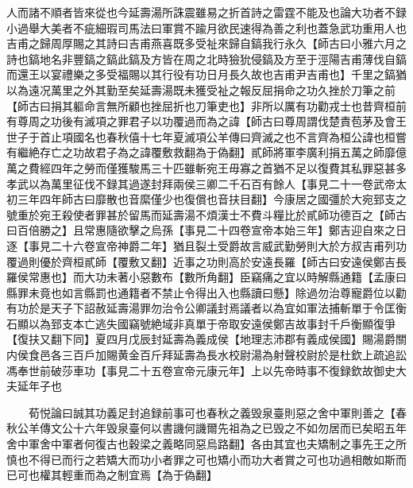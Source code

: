 人而諸不順者皆來從也今延壽湯所誅震雖易之折首詩之雷霆不能及也論大功者不録小過舉大美者不疵細瑕司馬法曰軍賞不踰月欲民速得為善之利也蓋急武功重用人也吉甫之歸周厚賜之其詩曰吉甫燕喜既多受祉來歸自鎬我行永久【師古曰小雅六月之詩也鎬地名非豐鎬之鎬此鎬及方皆在周之北時獫狁侵鎬及方至于涇陽吉甫薄伐自鎬而還王以宴禮樂之多受福賜以其行役有功日月長久故也吉甫尹吉甫也】千里之鎬猶以為遠况萬里之外其勤至矣延壽湯既未獲受祉之報反屈捐命之功久挫於刀筆之前【師古曰捐其軀命言無所顧也挫屈折也刀筆吏也】非所以厲有功勸戎士也昔齊桓前有尊周之功後有滅項之罪君子以功覆過而為之諱【師古曰尊周謂伐楚責苞茅及會王世子于首止項國名也春秋僖十七年夏滅項公羊傳曰齊滅之也不言齊為桓公諱也桓嘗有繼絶存亡之功故君子為之諱覆敷救翻為于偽翻】貳師將軍李廣利捐五萬之師靡億萬之費經四年之勞而僅獲駿馬三十匹雖斬宛王毋寡之首猶不足以復費其私罪惡甚多孝武以為萬里征伐不録其過遂封拜兩侯三卿二千石百有餘人【事見二十一卷武帝太初三年四年師古曰靡散也音縻僅少也復償也音扶目翻】今康居之國彊於大宛郅支之號重於宛王殺使者罪甚於留馬而延壽湯不煩漢士不費斗糧比於貳師功德百之【師古曰百倍勝之】且常惠隨欲擊之烏孫【事見二十四卷宣帝本始三年】鄭吉迎自來之日逐【事見二十六卷宣帝神爵二年】猶且裂土受爵故言威武勤勞則大於方叔吉甫列功覆過則優於齊桓貳師【覆敷又翻】近事之功則高於安遠長羅【師古曰安遠侯鄭吉長羅侯常惠也】而大功未著小惡數布【數所角翻】臣竊痛之宜以時解縣通籍【孟康曰縣罪未竟也如言縣罰也通籍者不禁止令得出入也縣讀曰懸】除過勿治尊寵爵位以勸有功於是天子下詔赦延壽湯罪勿治令公卿議封焉議者以為宜如軍法捕斬單于令匡衡石顯以為郅支本亡逃失國竊號絶域非真單于帝取安遠侯鄭吉故事封千戶衡顯復爭【復扶又翻下同】夏四月戊辰封延壽為義成侯【地理志沛郡有義成侯國】賜湯爵關内侯食邑各三百戶加賜黄金百斤拜延壽為長水校尉湯為射聲校尉於是杜欽上疏追訟馮奉世前破莎車功【事見二十五卷宣帝元康元年】上以先帝時事不復録欽故御史大夫延年子也

　　荀悦論曰誠其功義足封追録前事可也春秋之義毁泉臺則惡之舍中軍則善之【春秋公羊傳文公十六年毁泉臺何以書譏何譏爾先祖為之已毁之不如勿居而已矣昭五年舍中軍舍中軍者何復古也穀梁之義略同惡烏路翻】各由其宜也夫矯制之事先王之所慎也不得已而行之若矯大而功小者罪之可也矯小而功大者賞之可也功過相敵如斯而已可也權其輕重而為之制宜焉【為于偽翻】


